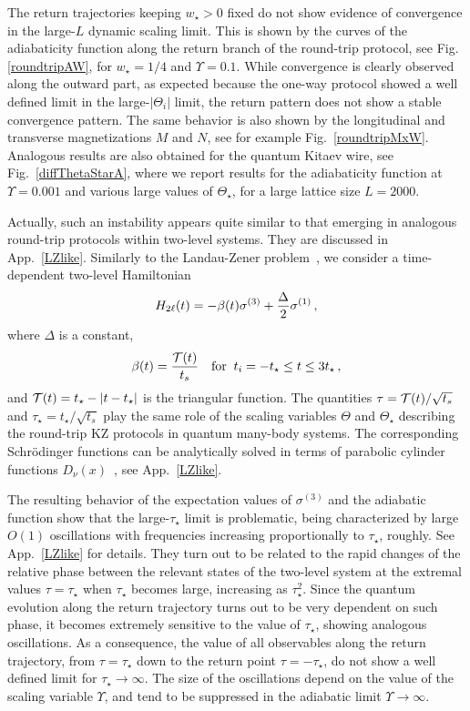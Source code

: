 The return trajectories keeping $w_\star>0$ fixed do not show evidence
of convergence in the large-$L$ dynamic scaling limit.  This is shown
by the curves of the adiabaticity function along the return branch of
the round-trip protocol, see Fig.\ref{roundtripAW}, for $w_\star=1/4$
and $\Upsilon=0.1$.  While convergence is clearly observed along the
outward part, as expected because the one-way protocol showed a well
defined limit in the large-$|\Theta_i|$ limit, the return pattern does
not show a stable convergence pattern. The same behavior is also shown
by the longitudinal and transverse magnetizations $M$ and $N$, see for
example Fig.~\ref{roundtripMxW}.  Analogous results are also obtained
for the quantum Kitaev wire, see Fig.~\ref{diffThetaStarA}, where we
report results for the adiabaticity function at $\Upsilon=0.001$ and
various large values of $\Theta_\star$, for a large lattice size
$L=2000$.

Actually, such an instability appears quite similar to that emerging
in analogous round-trip protocols within two-level systems.  They are
discussed in App.~\ref{LZlike}. Similarly to the 
Landau-Zener problem~\cite{zener1932non}, we consider a time-dependent two-level
Hamiltonian
\begin{equation}
  H_{2\ell}(t) = - \beta(t) \sigma^{(3)}
  + {\Delta\over 2} \sigma^{(1)}\,,
\label{hrdef2}
\end{equation}
where $\Delta$ is a constant, 
\begin{eqnarray}
  \beta(t) = {{\cal T}(t)\over t_s}\quad
       {\rm for}\;\; t_i=-t_\star \le t \le 3t_\star\,,
\label{betadef}
\end{eqnarray}
and $ {\cal T}(t) = t_\star - |t-t_\star|$ is the triangular
function. The quantities $\tau={\cal T}(t)/\sqrt{t_s}$ and
$\tau_\star=t_\star/\sqrt{t_s}$ play the same role of the scaling
variables $\Theta$ and $\Theta_\star$ describing the round-trip KZ
protocols in quantum many-body systems. The corresponding
Schr\"odinger functions can be analytically solved in terms 
of parabolic cylinder functions $D_\nu(x)$~\cite{vitanov1996landau}, see
App.~\ref{LZlike}.

The resulting behavior of the expectation values of $\sigma^{(3)}$ and
the adiabatic function show that the large-$\tau_\star$ limit is
problematic, being characterized by large $O(1)$ oscillations with
frequencies increasing proportionally to $\tau_\star$, roughly. See
App.~\ref{LZlike} for details.  They turn out to be related to the
rapid changes of the relative phase between the relevant states of the
two-level system at the extremal values $\tau=\tau_\star$ when
$\tau_\star$ becomes large, increasing as $\tau_\star^2$. Since the
quantum evolution along the return trajectory turns out to be very
dependent on such phase, it becomes extremely sensitive to the value
of $\tau_\star$, showing analogous oscillations. As a consequence, the
value of all observables along the return trajectory, from
$\tau=\tau_\star$ down to the return point $\tau = - \tau_\star$, do
not show a well defined limit for $\tau_\star\to\infty$.  The size of
the oscillations depend on the value of the scaling variable
$\Upsilon$, and tend to be suppressed in the adiabatic limit
$\Upsilon\to\infty$.

